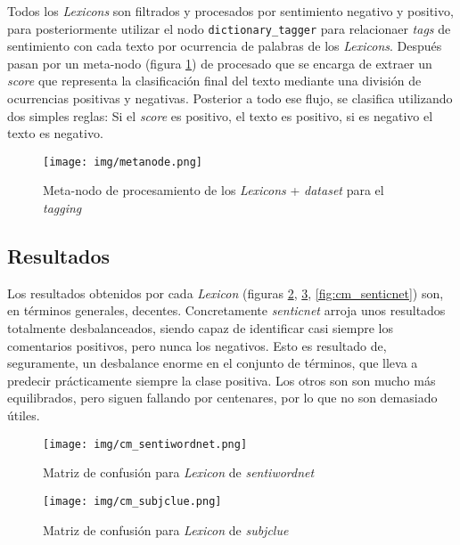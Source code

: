 \documentclass[12pt,letterpaper]{article}
\begin{document}
Todos los \textit{Lexicons} son filtrados y procesados por sentimiento negativo y positivo, para posteriormente utilizar el nodo \texttt{dictionary\_tagger} para relacionaer \textit{tags} de sentimiento con cada texto por ocurrencia de palabras de los \textit{Lexicons}. Después pasan por un meta-nodo (figura \ref{fig:metanode}) de procesado que se encarga de extraer un \textit{score} que representa la clasificación final del texto mediante una división de ocurrencias positivas y negativas. Posterior a todo ese flujo, se clasifica utilizando dos simples reglas: Si el \textit{score} es positivo, el texto es positivo, si es negativo el texto es negativo.

\begin{figure}[htp]
    \centering
    \texttt{[image: img/metanode.png]}
    \caption{Meta-nodo de procesamiento de los \textit{Lexicons} + \textit{dataset} para el \textit{tagging}}
    \label{fig:metanode}
\end{figure}

\subsection{Resultados}

Los resultados obtenidos por cada \textit{Lexicon} (figuras \ref{fig:cm_sentiwordnet}, \ref{fig:cm_subjclue}, \ref{fig:cm_senticnet}) son, en términos generales, decentes. Concretamente \textit{senticnet} arroja unos resultados totalmente desbalanceados, siendo capaz de identificar casi siempre los comentarios positivos, pero nunca los negativos. Esto es resultado de, seguramente, un desbalance enorme en el conjunto de términos, que lleva a predecir prácticamente siempre la clase positiva. Los otros son son mucho más equilibrados, pero siguen fallando por centenares, por lo que no son demasiado útiles.

\begin{figure}[htp]
    \centering
    \texttt{[image: img/cm\_sentiwordnet.png]}
    \caption{Matriz de confusión para \textit{Lexicon} de \textit{sentiwordnet}}
    \label{fig:cm_sentiwordnet}
\end{figure}

\begin{figure}[htp]
    \centering
    \texttt{[image: img/cm\_subjclue.png]}
    \caption{Matriz de confusión para \textit{Lexicon} de \textit{subjclue}}
    \label{fig:cm_subjclue}
\end{figure}
\end{document}

